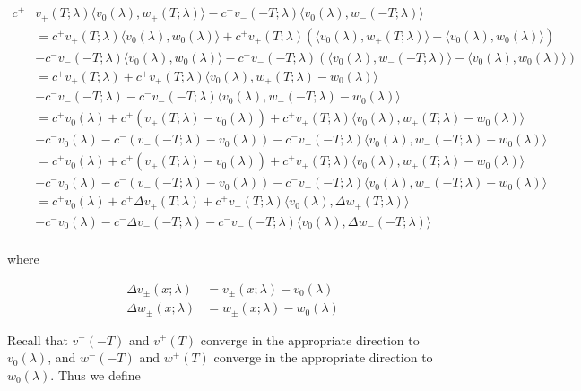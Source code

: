 \documentclass[12pt]{article}
\begin{document}
\begin{enumerate}
\begin{align*}
c^+ &v_+(T; \lambda)\langle v_0(\lambda), w_+(T; \lambda) \rangle - c^- v_-(-T; \lambda) \langle  v_0(\lambda), w_-(-T; \lambda) \rangle \\
&= c^+ v_+(T; \lambda)\langle v_0(\lambda), w_0(\lambda) \rangle + c^+ v_+(T; \lambda)( \langle v_0(\lambda), w_+(T; \lambda) \rangle - \langle v_0(\lambda), w_0(\lambda) \rangle )\\
&- c^- v_-(-T; \lambda)\langle v_0(\lambda), w_0(\lambda) \rangle - c^- v_-(-T; \lambda)( \langle v_0(\lambda), w_-(-T; \lambda) \rangle - \langle v_0(\lambda), w_0(\lambda) \rangle )\\
&= c^+ v_+(T; \lambda) + c^+ v_+(T; \lambda) \langle v_0(\lambda), w_+(T; \lambda) - w_0(\lambda) \rangle \\
&- c^- v_-(-T; \lambda) - c^- v_-(-T; \lambda) \langle v_0(\lambda), w_-(-T; \lambda) - w_0(\lambda) \rangle \\
&= c^+ v_0(\lambda) + c^+( v_+(T; \lambda) - v_0(\lambda)) + c^+ v_+(T; \lambda) \langle v_0(\lambda), w_+(T; \lambda) - w_0(\lambda) \rangle \\
&- c^- v_0(\lambda) - c^-( v_-(-T; \lambda) - v_0(\lambda)) - c^- v_-(-T; \lambda) \langle v_0(\lambda), w_-(-T; \lambda) - w_0(\lambda) \rangle \\
&= c^+ v_0(\lambda) + c^+( v_+(T; \lambda) - v_0(\lambda)) + c^+ v_+(T; \lambda) \langle v_0(\lambda), w_+(T; \lambda) - w_0(\lambda) \rangle \\
&- c^- v_0(\lambda) - c^-( v_-(-T; \lambda) - v_0(\lambda)) - c^- v_-(-T; \lambda) \langle v_0(\lambda), w_-(-T; \lambda) - w_0(\lambda) \rangle \\
&= c^+ v_0(\lambda) + c^+ \Delta v_+(T; \lambda) + c^+ v_+(T; \lambda) \langle v_0(\lambda), \Delta w_+(T; \lambda) \rangle \\
&- c^- v_0(\lambda) - c^- \Delta v_-(-T; \lambda) - c^- v_-(-T; \lambda) \langle v_0(\lambda), \Delta w_-(-T; \lambda) \rangle \\
\end{align*}

where 

\begin{align*}
\Delta v_\pm(x; \lambda) &= v_\pm(x; \lambda) - v_0(\lambda) \\
\Delta w_\pm(x; \lambda) &= w_\pm(x; \lambda) - w_0(\lambda)
\end{align*}

Recall that $v^-(-T)$ and $v^+(T)$ converge in the appropriate direction to $v_0(\lambda)$, and $w^-(-T)$ and $w^+(T)$ converge in the appropriate direction to $w_0(\lambda)$. Thus we define


\end{enumerate}
\end{document}
